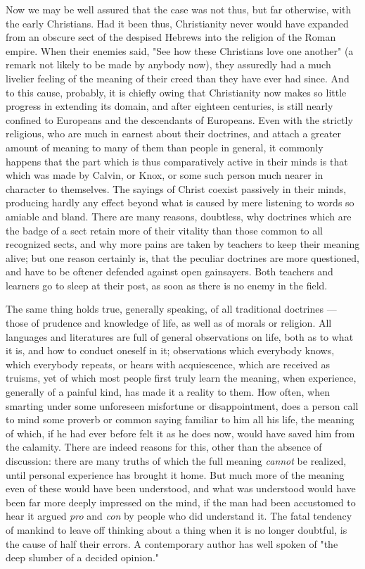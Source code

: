 \documentclass[12pt]{report}
\begin{document}
Now we may be well assured that the case was not thus, but far otherwise, with the early Christians. Had it been thus, Christianity never would have expanded from an obscure sect of the despised Hebrews into the religion of the Roman empire. When their enemies said, "See how these Christians love one another" (a remark not likely to be made by anybody now), they assuredly had a much livelier feeling of the meaning of their creed than they have ever had since. And to this cause, probably, it is chiefly owing that Christianity now makes so little progress in extending its domain, and after eighteen centuries, is still nearly confined to Europeans and the descendants of Europeans. Even with the strictly religious, who are much in earnest about their doctrines, and attach a greater amount of meaning to many of them than people in general, it commonly happens that the part which is thus comparatively active in their minds is that which was made by Calvin, or Knox, or some such person much nearer in character to themselves. The sayings of Christ coexist passively in their minds, producing hardly any effect beyond what is caused by mere listening to words so amiable and bland. There are many reasons, doubtless, why doctrines which are the badge of a sect retain more of their vitality than those common to all recognized sects, and why more pains are taken by teachers to keep their meaning alive; but one reason certainly is, that the peculiar doctrines are more questioned, and have to be oftener defended against open gainsayers. Both teachers and learners go to sleep at their post, as soon as there is no enemy in the field.

The same thing holds true, generally speaking, of all traditional doctrines — those of prudence and knowledge of life, as well as of morals or religion. All languages and literatures are full of general observations on life, both as to what it is, and how to conduct oneself in it; observations which everybody knows, which everybody repeats, or hears with acquiescence, which are received as truisms, yet of which most people first truly learn the meaning, when experience, generally of a painful kind, has made it a reality to them. How often, when smarting under some unforeseen misfortune or disappointment, does a person call to mind some proverb or common saying familiar to him all his life, the meaning of which, if he had ever before felt it as he does now, would have saved him from the calamity. There are indeed reasons for this, other than the absence of discussion: there are many truths of which the full meaning \emph{cannot} be realized, until personal experience has brought it home. But much more of the meaning even of these would have been understood, and what was understood would have been far more deeply impressed on the mind, if the man had been accustomed to hear it argued \emph{pro} and \emph{con} by people who did understand it. The fatal tendency of mankind to leave off thinking about a thing when it is no longer doubtful, is the cause of half their errors. A contemporary author has well spoken of "the deep slumber of a decided opinion."
\end{document}
